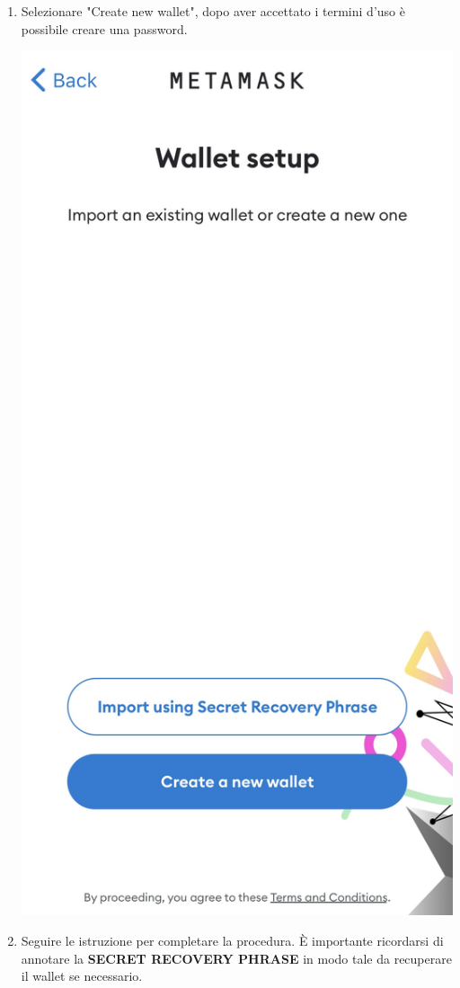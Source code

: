 \begin{enumerate}
    \item Selezionare "Create new wallet", dopo aver accettato i termini d'uso è possibile creare una password. \\
         \begin{center}
    \includegraphics[scale = 0.1]{img/metamask_mobile_store3.jpg}
    \end{center}
    
    \item Seguire le istruzione per completare la procedura. È importante ricordarsi di annotare la \textbf{SECRET RECOVERY PHRASE} in modo tale da recuperare il wallet se necessario.
    
\end{enumerate}
